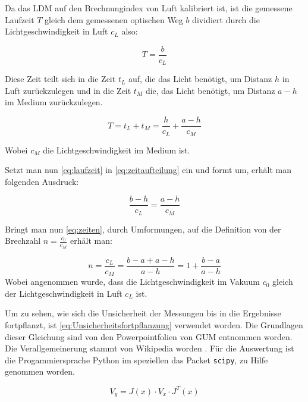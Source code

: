 \documentclass[11pt,ngerman]{scrartcl}
\begin{document}
Da das LDM auf den Brechnungindex von Luft kalibriert ist, ist die gemessene
Laufzeit $T$ gleich dem gemessenen optischen Weg $b$ dividiert durch
die Lichtgeschwindigkeit in Luft $c_L$ also:

\begin{equation}
    T =  \frac{b}{c_L} \label{eq:laufzeit}
\end{equation}

Diese Zeit teilt sich in die Zeit $t_L$ auf, die das Licht benötigt, 
um Distanz $h$ in Luft zurückzulegen und in die Zeit $t_M$ die, das 
Licht benötigt, um Distanz $a-h$ im Medium zurückzulegen.

\begin{equation}
    T = t_L + t_M  = \frac{h}{c_L} + \frac{a-h}{c_M}  \label{eq:zeitaufteilung}
\end{equation}

Wobei $c_M$ die Lichtgeschwindigkeit im Medium ist.

Setzt man nun \autoref{eq:laufzeit} in \autoref{eq:zeitaufteilung}
ein und formt um, erhält man folgenden Ausdruck:

\begin{equation}
    \frac{b-h}{c_L} = \frac{a-h}{c_M} \label{eq:zeiten}
\end{equation}

Bringt man nun \autoref{eq:zeiten}, durch Umformungen, auf die Definition von
der Brechzahl $n=\frac{c_0}{c_M}$ erhält man:

\begin{equation}
    n = \frac{c_L}{c_M} = \frac{b-a+a-h}{a-h} = 1 + \frac{b-a}{a-h} \label{eq:brechzahl}
\end{equation}
Wobei angenommen wurde, dass die Lichtgeschwindigkeit im Vakuum $c_0$
gleich der Lichtgeschwindigkeit in Luft $c_L$ ist.


Um zu sehen, wie sich die Unsicherheit der Messungen bis in die Ergebnisse 
fortpflanzt, ist \autoref{eq:Unsicherheitsfortpflanzung} verwendet worden.
Die Grundlagen dieser Gleichung sind von den Powerpointfolien von 
GUM entnommen worden.\cite{WolfgangKessel2004} Die Verallgemeinerung stammt von Wikipedia
worden \cite{2020Fehler}.
Für die Auswertung ist die Progammiersprache Python im speziellen das 
Packet \verb#scipy#, zu Hilfe genommen worden.

\begin{equation}
    \label{eq:Unsicherheitsfortpflanzung}
    V_y = J(x) \cdot V_x \cdot J^{T}(x)
\end{equation}
\end{document}
